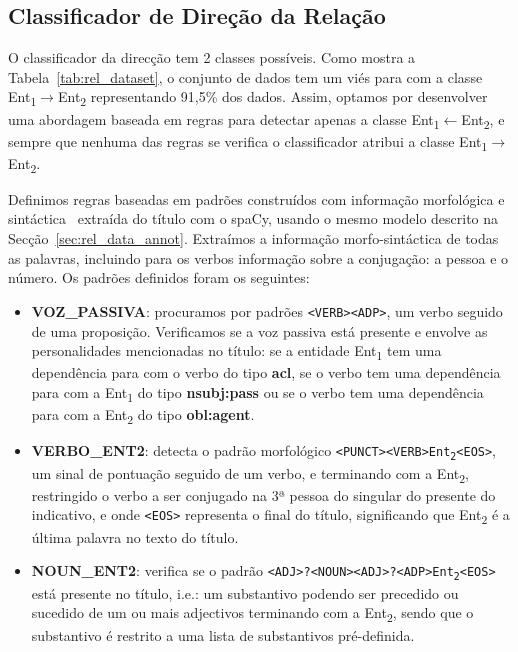 \documentclass[a4paper, twocolumn, 11pt, twoside]{article}
\begin{document}
\subsection{Classificador de Direção da Relação}
\label{subsec:rel_direction}

O classificador da direcção tem 2 classes possíveis. Como mostra a Tabela~\ref{tab:rel_dataset}, o conjunto de dados tem um viés para com a classe Ent\textsubscript{1}$\rightarrow$Ent\textsubscript{2} representando 91,5\% dos dados. Assim, optamos por desenvolver uma abordagem baseada em regras para detectar apenas a classe Ent\textsubscript{1}$\leftarrow$Ent\textsubscript{2}, e sempre que nenhuma das regras se verifica o classificador atribui a classe Ent\textsubscript{1}$\rightarrow$Ent\textsubscript{2}.

Definimos regras baseadas em padrões construídos com informação morfológica e sintáctica~\citep{nivre-etal-2020-universal} extraída do título com o spaCy, usando o mesmo modelo descrito na Secção~\ref{sec:rel_data_annot}. Extraímos a informação morfo-sintáctica de todas as palavras, incluindo para os verbos informação sobre a conjugação: a pessoa e o número. Os padrões definidos foram os seguintes:

\begin{itemize}

\item \textbf{VOZ\_PASSIVA}: procuramos por padrões \texttt{<VERB><ADP>}, um verbo seguido de uma proposição. Verificamos se a voz passiva está presente e envolve as personalidades mencionadas no título: se a entidade Ent\textsubscript{1} tem uma dependência para com o verbo do tipo \textbf{acl}, se o verbo tem uma dependência para com a Ent\textsubscript{1} do tipo \textbf{nsubj:pass} ou se o verbo tem uma dependência para com a Ent\textsubscript{2} do tipo \textbf{obl:agent}. 

\item \textbf{VERBO\_ENT2}: detecta o padrão morfológico \texttt{<PUNCT><VERB>Ent\textsubscript{2}<EOS>}, um sinal de pontuação seguido de um verbo, e terminando com a Ent\textsubscript{2}, restringido o verbo a ser conjugado na 3ª pessoa do singular do presente do indicativo, e onde \texttt{<EOS>} representa o final do título, significando que Ent\textsubscript{2} é a última palavra no texto do título.

\item \textbf{NOUN\_ENT2}: verifica se o padrão \texttt{<ADJ>?<NOUN><ADJ>?<ADP>Ent\textsubscript{2}<EOS>} está presente no título, i.e.: um substantivo podendo ser precedido ou sucedido de um ou mais adjectivos terminando com a Ent\textsubscript{2}, sendo que o substantivo é restrito a uma lista de substantivos pré-definida.
\end{itemize}
\end{document}

